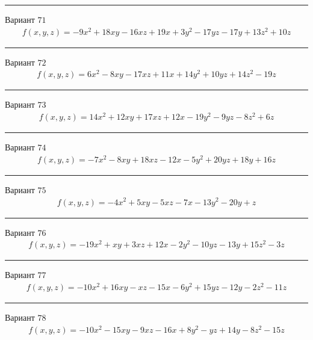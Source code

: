 \documentclass[11pt]{report}
\begin{document}
\begin{center}
\noindent\rule{8cm}{0.4pt}
\end{center}
Вариант $71$
\begin{align*}
    f(x, y, z) = - 9 x^{2} + 18 x y - 16 x z + 19 x + 3 y^{2} - 17 y z - 17 y + 13 z^{2} + 10 z
\end{align*}
\begin{center}
\noindent\rule{8cm}{0.4pt}
\end{center}
Вариант $72$
\begin{align*}
    f(x, y, z) = 6 x^{2} - 8 x y - 17 x z + 11 x + 14 y^{2} + 10 y z + 14 z^{2} - 19 z
\end{align*}
\begin{center}
\noindent\rule{8cm}{0.4pt}
\end{center}
Вариант $73$
\begin{align*}
    f(x, y, z) = 14 x^{2} + 12 x y + 17 x z + 12 x - 19 y^{2} - 9 y z - 8 z^{2} + 6 z
\end{align*}
\begin{center}
\noindent\rule{8cm}{0.4pt}
\end{center}
Вариант $74$
\begin{align*}
    f(x, y, z) = - 7 x^{2} - 8 x y + 18 x z - 12 x - 5 y^{2} + 20 y z + 18 y + 16 z
\end{align*}
\begin{center}
\noindent\rule{8cm}{0.4pt}
\end{center}
Вариант $75$
\begin{align*}
    f(x, y, z) = - 4 x^{2} + 5 x y - 5 x z - 7 x - 13 y^{2} - 20 y + z
\end{align*}
\begin{center}
\noindent\rule{8cm}{0.4pt}
\end{center}
Вариант $76$
\begin{align*}
    f(x, y, z) = - 19 x^{2} + x y + 3 x z + 12 x - 2 y^{2} - 10 y z - 13 y + 15 z^{2} - 3 z
\end{align*}
\begin{center}
\noindent\rule{8cm}{0.4pt}
\end{center}
Вариант $77$
\begin{align*}
    f(x, y, z) = - 10 x^{2} + 16 x y - x z - 15 x - 6 y^{2} + 15 y z - 12 y - 2 z^{2} - 11 z
\end{align*}
\begin{center}
\noindent\rule{8cm}{0.4pt}
\end{center}
Вариант $78$
\begin{align*}
    f(x, y, z) = - 10 x^{2} - 15 x y - 9 x z - 16 x + 8 y^{2} - y z + 14 y - 8 z^{2} - 15 z
\end{align*}
\end{document}
